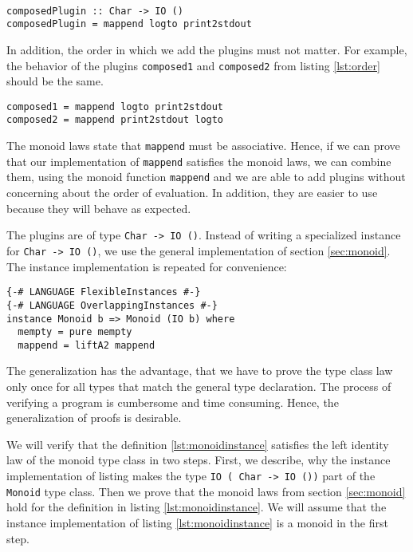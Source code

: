 \begin{lstlisting}[caption={Composition of two plugins}, label={lst:composition}]

composedPlugin :: Char -> IO ()
composedPlugin = mappend logto print2stdout
\end{lstlisting}

In addition, the order in which we add the plugins must not matter. For example, the behavior of the plugins \verb|composed1| and \verb|composed2| from listing \ref{lst:order} should be the same.

\begin{lstlisting}[caption={The order of the plugins must not matter.}, label={lst:order}]
composed1 = mappend logto print2stdout
composed2 = mappend print2stdout logto
\end{lstlisting}

The monoid laws state that \verb|mappend| must be associative. Hence, if we can prove that our implementation of \verb|mappend| satisfies the monoid laws, we can combine them, using the monoid function \verb|mappend| and we are able to add plugins without concerning about the order of evaluation. In addition, they are easier to use because they will behave as expected.

The plugins are of type \verb|Char -> IO ()|. Instead of writing a specialized instance for \verb|Char -> IO ()|, we use the general implementation of section \ref{sec:monoid}.
The instance implementation is repeated for convenience:

\begin{lstlisting}[caption={Monoid instance},label={lst:monoidinstance}]
{-# LANGUAGE FlexibleInstances #-}
{-# LANGUAGE OverlappingInstances #-}
instance Monoid b => Monoid (IO b) where
  mempty = pure mempty
  mappend = liftA2 mappend
\end{lstlisting}
The generalization has the advantage, that we have to prove the type class law only once for all types that match the general type declaration. The process of verifying a program is cumbersome and time consuming. Hence, the generalization of proofs is desirable.

We will verify that the definition \ref{lst:monoidinstance} satisfies the left identity law of the monoid type class in two steps. First, we describe, why the instance implementation of listing makes the type \verb|IO ( Char -> IO ())| part of the \verb|Monoid| type class. Then we prove that the monoid laws from section \ref{sec:monoid} hold for the definition in listing \ref{lst:monoidinstance}. We will assume that the instance implementation of listing \ref{lst:monoidinstance} is a monoid in the first step.

